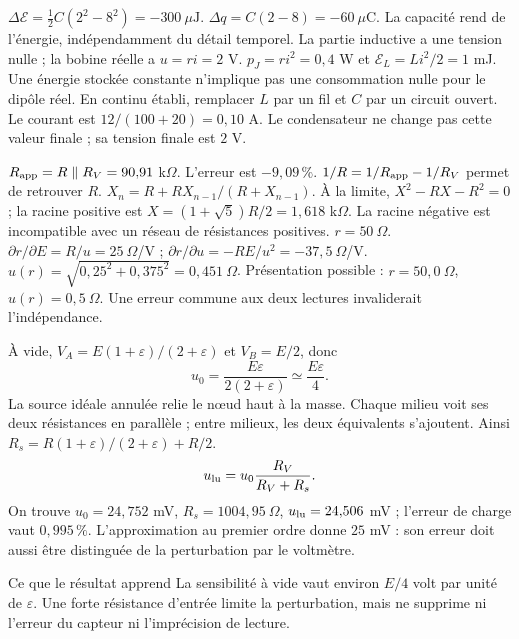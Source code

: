 $\Delta\mathcal E=\tfrac12C(2^2-8^2)=-300\ \mu\mathrm{ J}$. $\Delta q=C(2-8)=-60\ \mu\mathrm{ C}$. La capacité rend de l’énergie, indépendamment du détail temporel.
La partie inductive a une tension nulle ; la bobine réelle a $u=ri=2$ V. $p_J=ri^2=0{,}4$ W et $\mathcal E_L=Li^2/2=1$ mJ. Une énergie stockée constante n’implique pas une consommation nulle pour le dipôle réel.
En continu établi, remplacer $L$ par un fil et $C$ par un circuit ouvert. Le courant est $12/(100+20)=0{,}10$ A. Le condensateur ne change pas cette valeur finale ; sa tension finale est $2$ V.


$R_{\rm app}=R\parallel R_V=90{,}91$ k$\Omega$. L’erreur est $-9{,}09\,\%$. $1/R=1/R_{\rm app}-1/R_V$ permet de retrouver $R$.
$X_n=R+RX_{n-1}/(R+X_{n-1})$. À la limite, $X^2-RX-R^2=0$ ; la racine positive est $X=(1+\sqrt5)R/2=1{,}618$ k$\Omega$. La racine négative est incompatible avec un réseau de résistances positives.
$r=50\ \Omega$. $\partial r/\partial E=R/u=25\ \Omega$/V ; $\partial r/\partial u=-RE/u^2=-37{,}5\ \Omega$/V. $u(r)=\sqrt{0{,}25^2+0{,}375^2}=0{,}451\ \Omega$. Présentation possible : $r=50{,}0\ \Omega$, $u(r)=0{,}5\ \Omega$. Une erreur commune aux deux lectures invaliderait l’indépendance.


À vide, $V_A=E(1+\varepsilon)/(2+\varepsilon)$ et $V_B=E/2$, donc
\[u_0=\frac{E\varepsilon}{2(2+\varepsilon)}\simeq\frac{E\varepsilon}{4}.\]
La source idéale annulée relie le nœud haut à la masse. Chaque milieu voit ses deux résistances en parallèle ; entre milieux, les deux équivalents s’ajoutent. Ainsi $R_s=R(1+\varepsilon)/(2+\varepsilon)+R/2$.
\[u_{\rm lu}=u_0\frac{R_V}{R_V+R_s}.\]
On trouve $u_0=24{,}752$ mV, $R_s=1004{,}95\ \Omega$, $u_{\rm lu}=24{,}506$ mV ; l’erreur de charge vaut $0{,}995\,\%$. L’approximation au premier ordre donne $25$ mV : son erreur doit aussi être distinguée de la perturbation par le voltmètre.
\begin{methode}{Ce que le résultat apprend}
La sensibilité à vide vaut environ $E/4$ volt par unité de $\varepsilon$. Une forte résistance d’entrée limite la perturbation, mais ne supprime ni l’erreur du capteur ni l’imprécision de lecture.
\end{methode}


